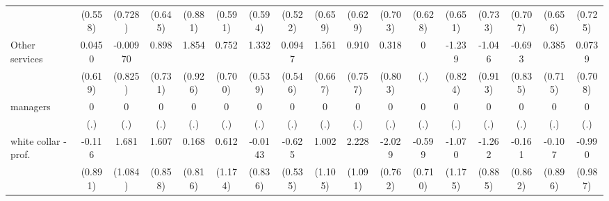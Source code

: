 {\begin{tabular}{l*{16}{c}}
                    &     (0.558)         &     (0.728)         &     (0.645)         &     (0.881)         &     (0.591)         &     (0.594)         &     (0.522)         &     (0.659)         &     (0.629)         &     (0.703)         &     (0.628)         &     (0.651)         &     (0.733)         &     (0.707)         &     (0.656)         &     (0.725)         \\
[1em]
Other services      &      0.0450         &    -0.00970         &       0.898         &       1.854\sym{*}  &       0.752         &       1.332\sym{*}  &      0.0947         &       1.561\sym{*}  &       0.910         &       0.318         &           0         &      -1.239         &      -1.046         &      -0.693         &       0.385         &      0.0739         \\
                    &     (0.619)         &     (0.825)         &     (0.731)         &     (0.926)         &     (0.700)         &     (0.539)         &     (0.546)         &     (0.667)         &     (0.757)         &     (0.803)         &         (.)         &     (0.824)         &     (0.913)         &     (0.835)         &     (0.715)         &     (0.708)         \\
[1em]
managers            &           0         &           0         &           0         &           0         &           0         &           0         &           0         &           0         &           0         &           0         &           0         &           0         &           0         &           0         &           0         &           0         \\
                    &         (.)         &         (.)         &         (.)         &         (.)         &         (.)         &         (.)         &         (.)         &         (.)         &         (.)         &         (.)         &         (.)         &         (.)         &         (.)         &         (.)         &         (.)         &         (.)         \\
[1em]
white collar - prof.&      -0.116         &       1.681         &       1.607         &       0.168         &       0.612         &     -0.0143         &      -0.625         &       1.002         &       2.228\sym{*}  &      -2.029\sym{**} &      -0.599         &      -1.070         &      -1.262         &      -0.161         &      -0.107         &      -0.990         \\
                    &     (0.891)         &     (1.084)         &     (0.858)         &     (0.816)         &     (1.174)         &     (0.836)         &     (0.535)         &     (1.105)         &     (1.091)         &     (0.762)         &     (0.710)         &     (1.175)         &     (0.885)         &     (0.862)         &     (0.896)         &     (0.987)         \\

\end{tabular}}
